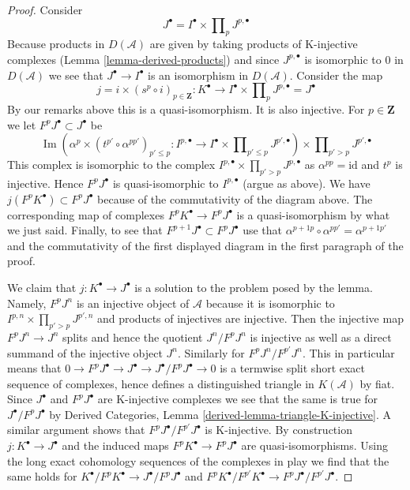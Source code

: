 \documentclass[10pt,a4paper]{amsart}
\theoremstyle{plain}
\theoremstyle{definition}
\theoremstyle{remark}
\numberwithin{equation}{subsection}
\def\Im{\mathop{\mathrm{Im}}}
\begin{document}
\begin{proof}
\medskip\noindent
Consider
$$
J^\bullet = I^\bullet \times \prod\nolimits_p J^{p, \bullet}
$$
Because products in $D(\mathcal{A})$ are given by taking
products of K-injective complexes
(Lemma \ref{lemma-derived-products})
and since $J^{p, \bullet}$
is isomorphic to $0$ in $D(\mathcal{A})$ we see that
$J^\bullet \to I^\bullet$ is an isomorphism in $D(\mathcal{A})$.
Consider the map
$$
j = i \times (s^p \circ i)_{p \in \mathbf{Z}} :
K^\bullet
\longrightarrow
I^\bullet \times \prod\nolimits_p J^{p, \bullet} = J^\bullet
$$
By our remarks above this is a quasi-isomorphism. It is also injective.
For $p \in \mathbf{Z}$ we let $F^pJ^\bullet \subset J^\bullet$ be
$$
\Im\left(
\alpha^p \times (t^{p'} \circ \alpha^{pp'})_{p' \leq p} :
I^{p, \bullet}
\to
I^\bullet \times \prod\nolimits_{p' \leq p} J^{p', \bullet}
\right)
\times \prod\nolimits_{p' > p} J^{p', \bullet}
$$
This complex is isomorphic to the complex
$I^{p, \bullet} \times \prod_{p' > p} J^{p, \bullet}$
as $\alpha^{pp} = \text{id}$ and $t^p$ is injective.
Hence $F^pJ^\bullet$ is quasi-isomorphic to $I^{p, \bullet}$ (argue
as above). We have $j(F^pK^\bullet) \subset F^pJ^\bullet$ because
of the commutativity of the diagram above. The corresponding
map of complexes $F^pK^\bullet \to F^pJ^\bullet$ is a quasi-isomorphism
by what we just said. Finally, to see that
$F^{p + 1}J^\bullet \subset F^pJ^\bullet$
use that $\alpha^{p + 1p} \circ \alpha^{pp'} = \alpha^{p + 1p'}$
and the commutativity of the first displayed diagram
in the first paragraph of the proof.

\medskip\noindent
We claim that $j : K^\bullet \to J^\bullet$ is a solution to the
problem posed by the lemma. Namely, $F^pJ^n$ is an injective object
of $\mathcal{A}$ because it is isomorphic to
$I^{p, n} \times \prod_{p' > p} J^{p', n}$ and products of
injectives are injective. Then the injective map $F^pJ^n \to J^n$
splits and hence the quotient $J^n/F^pJ^n$ is injective as well
as a direct summand of the injective object $J^n$.
Similarly for $F^pJ^n/F^{p'}J^n$. This in particular means
that $0 \to F^pJ^\bullet \to J^\bullet \to J^\bullet/F^pJ^\bullet \to 0$
is a termwise split short exact sequence of complexes, hence defines
a distinguished triangle in $K(\mathcal{A})$ by fiat.
Since $J^\bullet$ and $F^pJ^\bullet$ are K-injective complexes
we see that the same is true for $J^\bullet/F^pJ^\bullet$
by Derived Categories, Lemma \ref{derived-lemma-triangle-K-injective}.
A similar argument shows that $F^pJ^\bullet/F^{p'}J^\bullet$
is K-injective. By construction $j : K^\bullet \to J^\bullet$
and the induced maps $F^pK^\bullet \to F^pJ^\bullet$ are
quasi-isomorphisms. Using the long exact cohomology sequences
of the complexes in play we find that the same holds for
$K^\bullet/F^pK^\bullet \to J^\bullet/F^pJ^\bullet$ and
$F^pK^\bullet/F^{p'}K^\bullet \to F^pJ^\bullet/F^{p'}J^\bullet$.
\end{proof}



\end{document}
